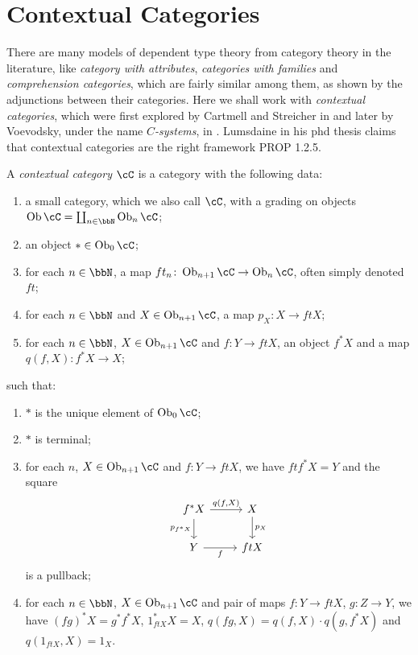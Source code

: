 \chapter*{Contextual Categories}

There are many models of dependent type theory from category theory in
the literature, like \emph{category with attributes}, \emph{categories with
families} and \emph{comprehension categories}, which are
fairly similar among them, as shown by the adjunctions between their categories.
Here we shall work with \emph{contextual
categories}, which were first explored by Cartmell and Streicher in
 and later by Voevodsky, under the name $C$\emph{-systems},
in . Lumsdaine in his phd thesis claims that contextual
categories are the right framework PROP 1.2.5.

\begin{defn}
  A \emph{contextual category} $\cC$ is a category with the following data:
  \begin{enumerate}
    \item a small category, which we also call $\cC$, with a grading on objects
      $\Ob\cC=\coprod_{n\in\bbN}\Ob_n\cC$;
    \item an object $*\in\Ob_0\cC$;
    \item for each $n\in\bbN$, a map
      $ft_n\colon\Ob_{n+1}\cC\rightarrow\Ob_n\cC$, often simply denoted $ft$;
    \item for each $n\in\bbN$ and $X\in\Ob_{n+1}\cC$, a map $p_X\colon
      X\rightarrow ftX$;
    \item for each $n\in\bbN$, $X\in\Ob_{n+1}\cC$ and $f\colon Y\rightarrow
      ftX$, an object $f^*X$ and a map $q(f,X)\colon f^*X\rightarrow X$;
  \end{enumerate}
  such that:
  \begin{enumerate}
    \item $*$ is the unique element of $\Ob_0\cC$;
    \item $*$ is terminal;
    \item for each $n$, $X\in\Ob_{n+1}\cC$ and $f\colon Y\rightarrow ftX$, we
      have $ft f^*X=Y$ and the square
      \[\begin{tikzcd}
        {f^*X} & X \\
        Y & ftX
        \arrow["f"', from=2-1, to=2-2]
        \arrow["{p_X}", from=1-2, to=2-2]
        \arrow["{q(f,X)}", from=1-1, to=1-2]
        \arrow["{p_{f^*X}}"', from=1-1, to=2-1]
      \end{tikzcd}\]
      is a pullback;
    \item for each $n\in\bbN$, $X\in\Ob_{n+1}\cC$ and pair of maps $f\colon
      Y\rightarrow ft X$, $g\colon Z\rightarrow Y$, we have $(fg)^*X=g^*f^*X$,
      $1^*_{ftX}X=X$, $q(fg,X)=q(f,X)\cdot q(g,f^*X)$ and $q(1_{ftX},X)=1_X$.
  \end{enumerate}
\end{defn}

